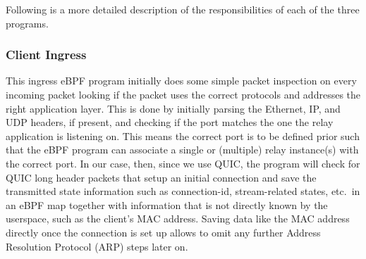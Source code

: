 \noindent
Following is a more detailed description of the responsibilities of each of the three programs.
\subsubsection{Client Ingress} 
This ingress eBPF program initially does some simple packet inspection on every incoming packet 
looking if the packet uses the correct protocols and addresses the right application layer.
This is done by initially parsing the Ethernet, IP, and UDP headers, if present, and checking if 
the port matches the one the relay application is listening on.
This means the correct port is to be defined prior such that the eBPF program can associate 
a single or (multiple) relay instance(s) with the correct port.
In our case, then, since we use QUIC, the program will check for QUIC long header packets that 
setup an initial connection and save the transmitted state information such as connection-id, 
stream-related states, etc.~in an eBPF map together with information that is not directly known
by the userspace, such as the client's MAC address.
Saving data like the MAC address directly once the connection is set up allows to omit any further 
Address Resolution Protocol (ARP) steps later on. 
